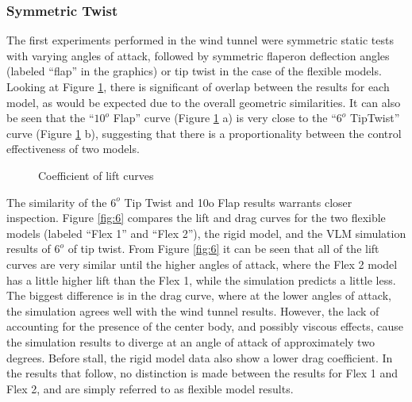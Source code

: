 \documentclass[11pt]{ucthesis}
\begin{document}
\subsubsection{Symmetric Twist}

The first experiments performed in the wind tunnel were symmetric static tests with varying angles of attack, followed by symmetric flaperon deflection angles (labeled “flap” in the graphics) or tip twist in the case of the flexible models. Looking at Figure \ref{fig:CL}, there is significant of overlap between the results for each model, as would be expected due to the overall geometric similarities. It can also be seen that the “$10^o$ Flap” curve (Figure \ref{fig:CL} a) is very close to the “$6^o$ TipTwist” curve (Figure \ref{fig:CL} b), suggesting that there is a proportionality between the control effectiveness of two models.

\begin{figure}[thpb]
\hfill
{}
\hfill
{}
\hfill
\caption{Coefficient of lift curves}
\label{fig:CL}
\end{figure}

The similarity of the $6^o$ Tip Twist and 10o Flap results warrants closer inspection. Figure \ref{fig:6} compares the lift and drag curves for the two flexible models (labeled “Flex 1” and “Flex 2”), the rigid model, and the VLM simulation results of $6^o$ of tip twist. From Figure \ref{fig:6} it can be seen that all of the lift curves are very similar until the higher angles of attack, where the Flex 2 model has a little higher lift than the Flex 1, while the simulation predicts a little less. The biggest difference is in the drag curve, where at the lower angles of attack, the simulation agrees well with the wind tunnel results. However, the lack of accounting for the presence of the center body, and possibly viscous effects, cause the simulation results to diverge at an angle of attack of approximately two degrees. Before stall, the rigid model data also show a lower drag coefficient.  In the results that follow, no distinction is made between the results for Flex 1 and Flex 2, and are simply referred to as flexible model results.
\end{document}
